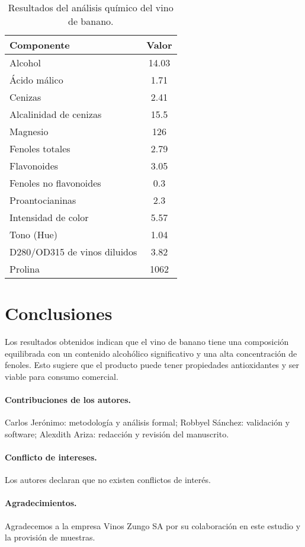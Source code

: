 \documentclass[a4paper, 10pt]{article}
\begin{document}
\begin{table}[h]
\centering
\begin{tabular}{|l|c|}
\hline
\textbf{Componente} & \textbf{Valor} \\
\hline
Alcohol & 14.03 \\
Ácido málico & 1.71 \\
Cenizas & 2.41 \\
Alcalinidad de cenizas & 15.5 \\
Magnesio & 126 \\
Fenoles totales & 2.79 \\
Flavonoides & 3.05 \\
Fenoles no flavonoides & 0.3 \\
Proantocianinas & 2.3 \\
Intensidad de color & 5.57 \\
Tono (Hue) & 1.04 \\
D280/OD315 de vinos diluidos & 3.82 \\
Prolina & 1062 \\
\hline
\end{tabular}
\caption{Resultados del análisis químico del vino de banano.}
\label{tabla:resultados}
\end{table}

\section{Conclusiones}
Los resultados obtenidos indican que el vino de banano tiene una composición equilibrada con un contenido alcohólico significativo y una alta concentración de fenoles. Esto sugiere que el producto puede tener propiedades antioxidantes y ser viable para consumo comercial.

\paragraph{Contribuciones de los autores.} Carlos Jerónimo: metodología y análisis formal; Robbyel Sánchez: validación y software; Alexdith Ariza: redacción y revisión del manuscrito.

\paragraph{Conflicto de intereses.} Los autores declaran que no existen conflictos de interés.

\paragraph{Agradecimientos.} Agradecemos a la empresa Vinos Zungo SA por su colaboración en este estudio y la provisión de muestras.



\end{document}
